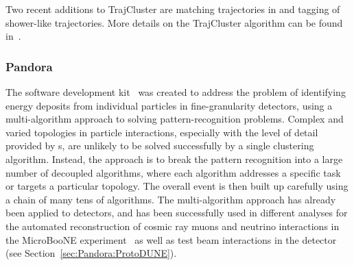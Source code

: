 Two recent additions to TrajCluster are matching trajectories in \threed and tagging of shower-like trajectories. More details on the TrajCluster algorithm can be found in~\cite{ref:trajcluster}.



\subsubsection{Pandora}\label{sec:Pandora}

The  software development kit~\cite{Marshall:2015rfa} was created to address the problem of identifying energy deposits from individual particles in fine-granularity detectors, using a multi-algorithm approach to solving pattern-recognition problems. Complex and varied topologies in particle interactions, especially with the level of detail provided by \lartpc{}s, are unlikely to be solved successfully by a single clustering algorithm. Instead, the  approach is to break the pattern recognition into a large number of decoupled algorithms, where each algorithm addresses a specific task or targets a particular topology. The overall event is then built up carefully using a chain of many tens of algorithms. The  multi-algorithm approach has already been applied to \lartpc{} detectors, and has been successfully used in different analyses for the automated reconstruction of cosmic ray muons and neutrino interactions in the MicroBooNE experiment~\cite{Acciarri:2017hat} as well as test beam interactions in the  detector (see Section~\ref{sec:Pandora:ProtoDUNE}).




